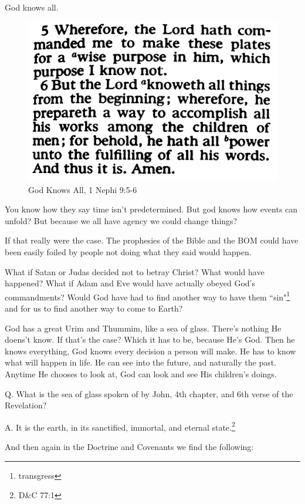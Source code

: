 God knows all.

\begin{figure}[h!]
  \centering
  \includegraphics[width=.5\linewidth]{2018/images/know.jpg}
  \caption{God Knows All, 1 Nephi 9:5-6}
  \label{fig:knowledge}
\end{figure}

You know how they say time isn't predetermined. But god knows how events can unfold? 
But because we all have agency we could change things?

If that really were the case. The prophesies of the Bible and the BOM 
could have been easily foiled by people not doing what they said would happen.

What if Satan or Judas decided not to betray Christ? What would have happened? What
if Adam and Eve would have actually obeyed God's commandments? Would God have had to
find another way to have them ``sin"\footnote{transgress} and for us to find another
way to come to Earth?

God has a great Urim and Thummim, like a sea of glass. There's nothing He doens't
know. If that's the case? Which it has to be, because He's God. Then he knows
everything, God knows every decision a person will make. He has to know what will
happen in life. He can see into the future, and naturally the past. Anytime He
chooses to look at, God can look and see His children's doings.

\begin{displayquote}
Q. What is the sea of glass spoken of by John, 4th chapter, and 6th verse of the 
Revelation?

A. It is the earth, in its sanctified, immortal, and eternal 
state.\footnote{D\&C 77:1}
\end{displayquote}

And then again in the Doctrine and Covenants we find the following:


